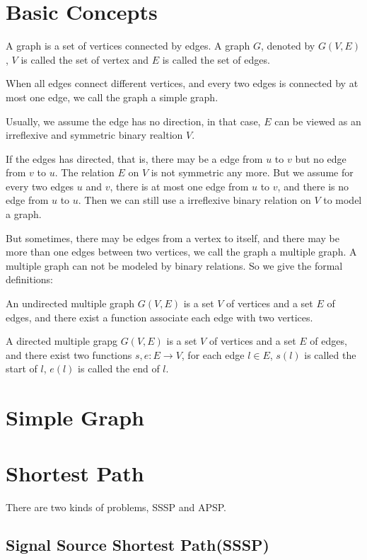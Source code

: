 \section{Basic Concepts}
A graph is a set of vertices connected by edges.
A graph $G$, denoted by $G(V, E)$, $V$ is called the set of vertex and $E$ is called the set of edges.

When all edges connect different vertices, and every two edges is connected by at most one edge, 
we call the graph a simple graph. 

Usually, we assume the edge has no direction, in that case,
$E$ can be viewed as an irreflexive and symmetric binary realtion $V$.

If the edges has directed, that is, there may be a edge from $u$ to $v$ but no edge from $v$ to $u$.
The relation $E$ on $V$ is not symmetric any more. But we assume for every two edges $u$ and $v$, 
there is at most one edge from $u$ to $v$, and there is no edge from $u$ to $u$.
Then we can still use a irreflexive binary relation on $V$ to model a graph.

But sometimes, there may be edges from a vertex to itself, and there may be more than one edges 
between two vertices, we call the graph a multiple graph. A multiple graph can not be modeled by 
binary relations. So we give the formal definitions:

An undirected multiple graph $G(V, E)$ is a set $V$ of vertices and a set $E$ of edges, and there 
exist a function associate each edge with two vertices.

A directed multiple grapg $G(V, E)$ is a set $V$ of vertices and a set $E$ of edges, and there
exist two functions $s, e : E \to V$, for each edge $l \in E$, $s(l)$ is called the start of $l$, 
$e(l)$ is called the end of $l$.

\section{Simple Graph}

\section{Shortest Path}
There are two kinds of problems, SSSP and APSP.
	\subsection{Signal Source Shortest Path(SSSP)}
